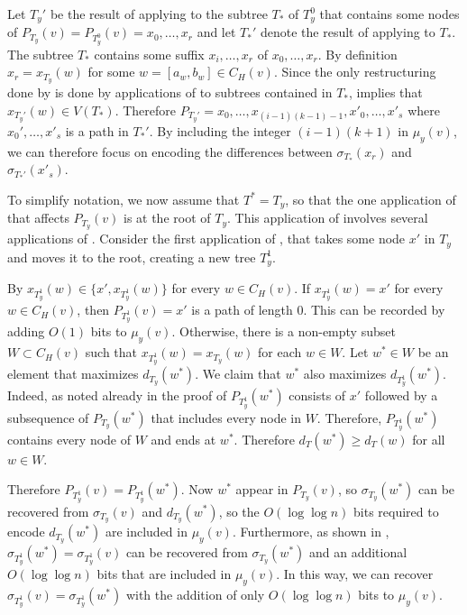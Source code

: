 \documentclass[kpfonts]{patmorin}
\begin{document}
Let $T_y'$ be the result of applying  to the subtree $T_*$ of $T_y^0$ that contains some nodes of $P_{T_y}(v)=P_{T_y^0}(v)=x_0,\ldots,x_r$ and let $T_*'$ denote the result of applying  to $T_*$.
The subtree $T_*$ contains some suffix $x_i,\ldots,x_r$ of $x_0,\ldots,x_r$.  By definition $x_r=x_{T_y}(w)$ for some $w=[a_w,b_w]\in C_H(v)$.  Since the only restructuring done by  is done by applications of  to subtrees contained in $T_*$,   implies that $x_{T_y'}(w)\in V(T_*)$.  Therefore $P_{T_y'}=x_0,\ldots,x_{(i-1)(k-1)-1},x'_0,\ldots,x'_{s}$ where $x_0',\ldots,x'_s$ is a path in $T_*'$. By including the integer $(i-1)(k+1)$ in $\mu_y(v)$, we can therefore focus on encoding the differences between $\sigma_{T_*}(x_r)$ and $\sigma_{T_*'}(x'_s)$.

To simplify notation, we now assume that $T^*=T_y$, so that the one application of  that affects $P_{T_y}(v)$ is at the root of $T_y$.
This application of  involves several applications of .  Consider the first application of , that takes some node $x'$ in $T_y$ and moves it to the root, creating a new tree $T_y^1$.

By  $x_{T_y^1}(w)\in\{x',x_{T_y^1}(w)\}$ for every $w\in C_H(v)$.  If $x_{T_y^1}(w)=x'$ for every $w\in C_H(v)$, then $P_{T_y^1}(v)=x'$ is a path of length 0.  This can be recorded by adding $O(1)$ bits to $\mu_y(v)$. Otherwise, there is a non-empty subset $W\subset C_H(v)$ such that $x_{T_y^1}(w)=x_{T_y}(w)$ for each $w\in W$.  Let $w^*\in W$ be an element that maximizes $d_{T_y}(w^*)$.  We claim that $w^*$ also maximizes $d_{T_y^1}(w^*)$.  Indeed, as noted already in the proof of  $P_{T_y^1}(w^*)$ consists of $x'$ followed by a subsequence of $P_{T_y}(w^*)$ that includes every node in $W$.  Therefore, $P_{T_y^1}(w^*)$ contains every node of $W$ and ends at $w^*$.  Therefore $d_T(w^*)\ge d_T(w)$ for all $w\in W$.

Therefore $P_{T_y^1}(v)=P_{T_y^1}(w^*)$.  Now $w^*$ appear in $P_{T_y}(v)$, so $\sigma_{T_y}(w^*)$ can be recovered from $\sigma_{T_y}(v)$ and $d_{T_y}(w^*)$, so the $O(\log\log n)$ bits required to encode $d_{T_y}(w^*)$ are included in $\mu_y(v)$.  Furthermore, as shown in , $\sigma_{T_y^1}(w^*)=\sigma_{T_y^1}(v)$ can be recovered from $\sigma_{T_y}(w^*)$ and an additional $O(\log\log n)$ bits that are included in $\mu_y(v)$.  In this way, we can recover $\sigma_{T_y^1}(v)=\sigma_{T_y^1}(w^*)$ with the addition of only $O(\log\log n)$ bits to $\mu_y(v)$.
\end{document}
